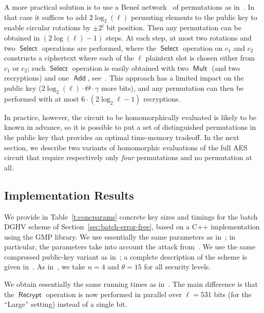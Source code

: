 \documentclass[11pt]{llncs}
\DeclareMathOperator{\Recrypt}{\ensuremath{\mathsf{Recrypt}}}
\DeclareMathOperator{\Add}{\ensuremath{\mathsf{Add}}}
\DeclareMathOperator{\Mult}{\ensuremath{\mathsf{Mult}}}
\DeclareMathOperator{\Select}{\ensuremath{\mathsf{Select}}}
\begin{document}
A more practical solution is to use a Bene\v{s} network~\cite{Ben1964} of
permutations as in~\cite{GHS2012a}. In that case it suffices to add
$2\log_2(\ell)$ permuting elements to the public key to enable circular
rotations by $\pm 2^i$ bit position. Then any permutation can be obtained
in $(2\log(\ell)-1)$ steps. At each step, at most two rotations and two
$\Select$ operations are performed, where the $\Select$ operation on
$c_1$ and $c_2$ constructs a ciphertext where each of the $\ell$
plaintext slot is chosen either from $c_1$ or $c_2$; such $\Select$
operation is easily obtained with two $\Mult$ (and two recryptions)
and one $\Add$, see~\cite{GHS2012a}. This approach has a
limited impact on the public key ($2\log_2(\ell)\cdot \Theta\cdot \gamma$
more bits), and any permutation can then be performed with at most
$6 \cdot (2 \log_2 \ell-1)$ recryptions.

In practice, however, the circuit to be homomorphically evaluated is
likely to be known in advance, so it is possible to put a set of
distinguished permutations in the public key that provides an optimal
time-memory tradeoff. In the next section, we describe two variants of
homomorphic evaluations of the full AES circuit that require respectively only
\emph{four} permutations and no permutation
at all.

\subsection{Implementation Results}\label{subsec:practical-implementation}

We provide  in Table~\ref{t:concparams} concrete key sizes and timings
for the batch DGHV scheme of Section~\ref{sec:batch-error-free}, 
based on a C++ implementation using the GMP
library. We use essentially the same parameters as
in~\cite{CNT2012,FHEGITHUB}; in particular, the parameters take into
account the attack from~\cite{CN2012}. We use the same compressed
public-key variant as in~\cite{CNT2012}; a complete
description of the scheme is given in~\cite{CLT2013a}.   As
in~\cite{CMNT2011,CNT2012}, we take $n=4$ and $\theta=15$ for all
security levels. 

We obtain essentially the same running times as in~\cite{CNT2012}. The
main difference is that the $\Recrypt$ operation is now performed in
parallel over $\ell=531$ bits (for the ``Large'' setting) instead of a
single bit. 
\end{document}
